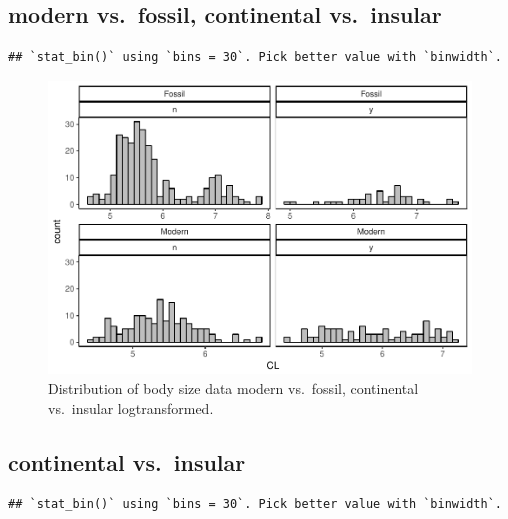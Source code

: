 \documentclass[]{article}
\begin{document}
\newpage

\subsection{modern vs.~fossil, continental
vs.~insular}\label{modern-vs.fossil-continental-vs.insular}

\begin{verbatim}
## `stat_bin()` using `bins = 30`. Pick better value with `binwidth`.
\end{verbatim}

\begin{figure}[htbp]
\centering
\includegraphics{MA_JJ_files/figure-latex/Histograms of body size data, modern vs. fossil, continental vs. insular-1.pdf}
\caption{Distribution of body size data modern vs.~fossil, continental
vs.~insular logtransformed.}
\end{figure}

\newpage

\subsection{continental vs.~insular}\label{continental-vs.insular}

\begin{verbatim}
## `stat_bin()` using `bins = 30`. Pick better value with `binwidth`.
\end{verbatim}
\end{document}
